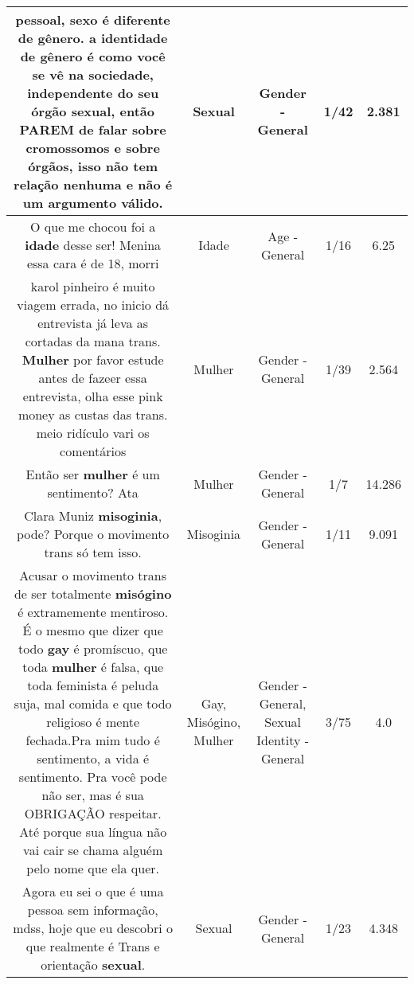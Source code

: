 \documentclass[11pt]{article}
\newlength\mylength
\begin{document}
\begin{center}
\begin{longtable}{|C{.65\mylength}|C{.30\mylength}|C{.12\mylength}|C{.12\mylength}|C{.12\mylength}|}
  \small pessoal, sexo é diferente de gênero. a identidade de gênero é como você se vê na sociedade, independente do seu órgão \textbf{sexual}, então PAREM de falar sobre cromossomos e sobre órgãos, isso não tem relação nenhuma e não é um argumento válido.\normalsize   & Sexual & Gender - General & 1/42 & 2.381 \\  \hline
  \small O que me chocou foi a \textbf{idade} desse ser! Menina essa cara é de 18, morri\normalsize   & Idade & Age - General & 1/16 & 6.25 \\  \hline
  \small karol pinheiro é muito viagem errada, no inicio dá entrevista já leva as cortadas da mana trans. \textbf{Mulher} por favor estude antes de fazeer essa entrevista, olha esse pink money as custas das trans. meio ridículo vari os comentários\normalsize   & Mulher & Gender - General & 1/39 & 2.564 \\  \hline
  \small Então ser \textbf{mulher} é um sentimento? Ata\normalsize   & Mulher & Gender - General & 1/7 & 14.286 \\  \hline
  \small Clara Muniz \textbf{misoginia}, pode? Porque o movimento trans só tem isso.\normalsize   & Misoginia & Gender - General & 1/11 & 9.091 \\  \hline
  \small Acusar o movimento trans de ser totalmente \textbf{misógino} é extramemente mentiroso. É o mesmo que dizer que todo \textbf{gay} é promíscuo,  que toda \textbf{mulher} é falsa, que toda feminista é peluda suja, mal comida e que todo religioso é mente fechada.Pra mim tudo é sentimento,  a vida é sentimento.  Pra você pode não ser, mas é sua OBRIGAÇÃO respeitar. Até porque sua língua não vai cair se chama alguém pelo nome que ela quer.\normalsize   & Gay, Misógino, Mulher & Gender - General, Sexual Identity - General & 3/75 & 4.0 \\  \hline
  \small Agora eu sei o que é uma pessoa sem informação, mdss, hoje que eu descobri o que realmente é Trans e orientação \textbf{sexual}.\normalsize   & Sexual & Gender - General & 1/23 & 4.348 \\  \hline

\end{longtable}
\end{center}
\end{document}
